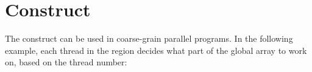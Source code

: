 \pagebreak
\section{ Construct}
\label{sec:parallel}

The  construct  can be used in coarse-grain parallel programs. 
In the following example, each thread in the  region decides what 
part of the global array  to work on, based on the thread number:



